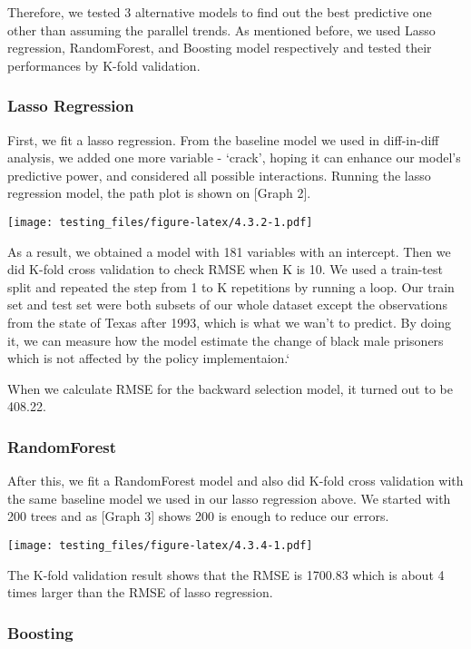 \documentclass[
]{article}
\begin{document}
Therefore, we tested 3 alternative models to find out the best
predictive one other than assuming the parallel trends. As mentioned
before, we used Lasso regression, RandomForest, and Boosting model
respectively and tested their performances by K-fold validation.

\hypertarget{lasso-regression}{%
\subsubsection{Lasso Regression}\label{lasso-regression}}

First, we fit a lasso regression. From the baseline model we used in
diff-in-diff analysis, we added one more variable - `crack', hoping it
can enhance our model's predictive power, and considered all possible
interactions. Running the lasso regression model, the path plot is shown
on {[}Graph 2{]}.

\texttt{[image: testing\_files/figure-latex/4.3.2-1.pdf]}

As a result, we obtained a model with 181 variables with an intercept.
Then we did K-fold cross validation to check RMSE when K is 10. We used
a train-test split and repeated the step from 1 to K repetitions by
running a loop. Our train set and test set were both subsets of our
whole dataset except the observations from the state of Texas after
1993, which is what we wan't to predict. By doing it, we can measure how
the model estimate the change of black male prisoners which is not
affected by the policy implementaion.`

When we calculate RMSE for the backward selection model, it turned out
to be 408.22.

\hypertarget{randomforest}{%
\subsubsection{RandomForest}\label{randomforest}}

After this, we fit a RandomForest model and also did K-fold cross
validation with the same baseline model we used in our lasso regression
above. We started with 200 trees and as {[}Graph 3{]} shows 200 is
enough to reduce our errors.

\texttt{[image: testing\_files/figure-latex/4.3.4-1.pdf]}

The K-fold validation result shows that the RMSE is 1700.83 which is
about 4 times larger than the RMSE of lasso regression.

\hypertarget{boosting}{%
\subsubsection{Boosting}\label{boosting}}
\end{document}
